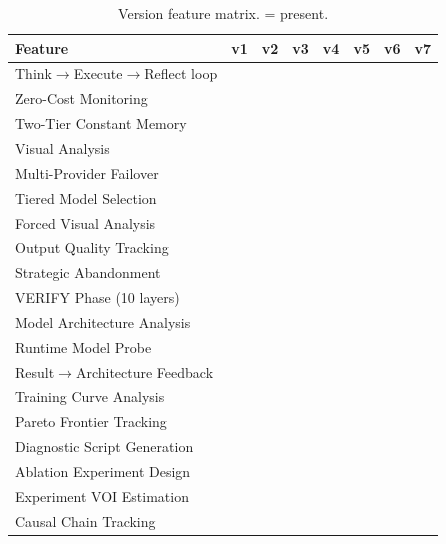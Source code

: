 \documentclass[11pt,a4paper]{article}
\newcommand{\cmark}{\textcolor{green!60!black}{\checkmark}}
\begin{document}
\begin{table}[t]
\centering
\small
\begin{threeparttable}
\caption{Version feature matrix. \cmark{} = present.}
\label{tab:version_matrix}
\begin{tabularx}{\linewidth}{X ccccccc}
\toprule
\textbf{Feature} & \textbf{v1} & \textbf{v2} & \textbf{v3} & \textbf{v4} & \textbf{v5} & \textbf{v6} & \textbf{v7} \\
\midrule
Think$\to$Execute$\to$Reflect loop & \cmark & \cmark & \cmark & \cmark & \cmark & \cmark & \cmark \\
Zero-Cost Monitoring & \cmark & \cmark & \cmark & \cmark & \cmark & \cmark & \cmark \\
Two-Tier Constant Memory & \cmark & \cmark & \cmark & \cmark & \cmark & \cmark & \cmark \\
Visual Analysis & \cmark & \cmark & \cmark & \cmark & \cmark & \cmark & \cmark \\
Multi-Provider Failover & & \cmark & \cmark & \cmark & \cmark & \cmark & \cmark \\
Tiered Model Selection & & \cmark & \cmark & \cmark & \cmark & \cmark & \cmark \\
Forced Visual Analysis & & & \cmark & \cmark & \cmark & \cmark & \cmark \\
Output Quality Tracking & & & \cmark & \cmark & \cmark & \cmark & \cmark \\
Strategic Abandonment & & & \cmark & \cmark & \cmark & \cmark & \cmark \\
VERIFY Phase (10 layers) & & & & \cmark & \cmark & \cmark & \cmark \\
Model Architecture Analysis & & & & \cmark & \cmark & \cmark & \cmark \\
Runtime Model Probe & & & & \cmark & \cmark & \cmark & \cmark \\
Result$\to$Architecture Feedback & & & & \cmark & \cmark & \cmark & \cmark \\
Training Curve Analysis & & & & & \cmark & \cmark & \cmark \\
Pareto Frontier Tracking & & & & & \cmark & \cmark & \cmark \\
Diagnostic Script Generation & & & & & \cmark & \cmark & \cmark \\
Ablation Experiment Design & & & & & \cmark & \cmark & \cmark \\
Experiment VOI Estimation & & & & & \cmark & \cmark & \cmark \\
Causal Chain Tracking & & & & & \cmark & \cmark & \cmark \\

\end{tabularx}
\end{threeparttable}
\end{table}
\end{document}
